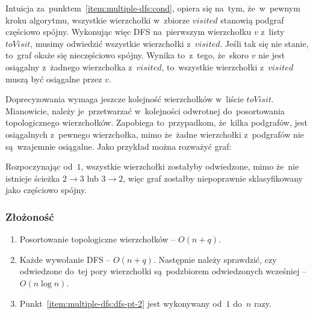 \documentclass[a4paper,12pt]{mwart}
\begin{document}
Intuicja za~punktem~\ref{item:multiple-dfs:cond}, opiera się na~tym,
że~w~pewnym kroku algorytmu, wszystkie wierzchołki w~zbiorze $visited$ stanowią
podgraf częściowo spójny. Wykonując więc DFS na~pierwszym wierzchołku $v$
z~listy $toVisit$, musimy odwiedzić wszystkie wierzchołki z~$visited$. Jeśli
tak się nie stanie, to~graf okaże się nieczęściowo spójny. Wynika to~z~tego,
że~skoro $v$ nie jest osiągalny z~żadnego wierzchołka z~$visited$, to~wszystkie
wierzchołki z~$visited$ muszą być osiągalne przez $v$.

Doprecyzowania wymaga jeszcze kolejność wierzchołków w~liście $toVisit$.
Mianowicie, należy je~przetwarzać w~kolejności odwrotnej do~posortowania
topologicznego wierzchołków. Zapobiega to~przypadkom, że~kilka podgrafów, jest
osiągalnych z~pewnego wierzchołka, mimo że~żadne wierzchołki z~podgrafów nie
są~wzajemnie osiągalne. Jako przykład można rozważyć graf:

\begin{figure}[H]
  \centering
\end{figure}

Rozpoczynając od~$1$, wszystkie wierzchołki zostałyby odwiedzone, mimo że~nie
istnieje ścieżka $2 \to 3$ lub $3 \to 2$, więc graf zostałby niepoprawnie
sklasyfikowany jako częściowo spójny.

\subsubsection{Złożoność}

\begin{enumerate}
\item Posortowanie topologiczne wierzchołków -- $O(n + q)$.
\item\label{item:multiple-dfs:dfs-pt-2} Każde wywołanie DFS -- $O(n + q)$.
  Następnie należy sprawdzić, czy odwiedzone do~tej pory wierzchołki
  są~podzbiorem odwiedzonych wcześniej -- $O(n \log n)$.
\item Punkt~\ref{item:multiple-dfs:dfs-pt-2} jest wykonywany od~$1$ do~$n$ razy.
\end{enumerate}
\end{document}
